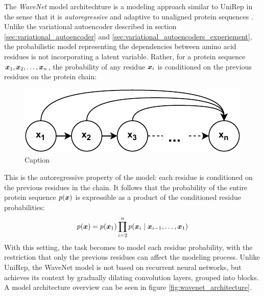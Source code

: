 The \textit{WaveNet} model architechture is a modeling approach similar to UniRep in the sense that it is \textit{autoregressive} and adaptive to unaligned protein sequences \cite{AlQuraishiUnsupervised, oord2016wavenet}. Unlike the variational autoencoder described in section \ref{sec:variational_autoencoder} and \ref{sec:variational_autoencoders_experiement}, the probabilistic model representing the dependencies between amino acid residues is not incorporating a latent variable. Rather, for a protein sequence $\bm{ x }_1, \bm{ x }_2, \ldots, \bm{ x }_n$, the probability of any residue $\bm{ x }_i$ is conditioned on the previous residues on the protein chain:
\begin{figure}[H]
    \centering
    \includegraphics{report/figures/autoregressive.pdf}
    \caption{Caption }
    \label{fig:autoregressive}
\end{figure}
This is the autoregressive property of the model: each residue is conditioned on the previous residues in the chain. It follows that the probability of the entire protein sequence $p(\bm{ x })$ is expressible as a product of the conditioned residue probabilities:
\[ p(\bm{ x }) = p(\bm{ x }_1) \prod_{i = 2}^n p(\bm{ x }_i \mid \bm{ x }_{i - 1}, \ldots, \bm{ x }_1)
\]
 With this setting, the task becomes to model each residue probability, with the restriction that only the previous residues can affect the modeling process. Unlike UniRep, the WaveNet model is not based on recurrent neural networks, but achieves its context by gradually dilating convolution layers, grouped into blocks. A model architecture overview can be seen in figure \ref{fig:wavenet_architecture}.

